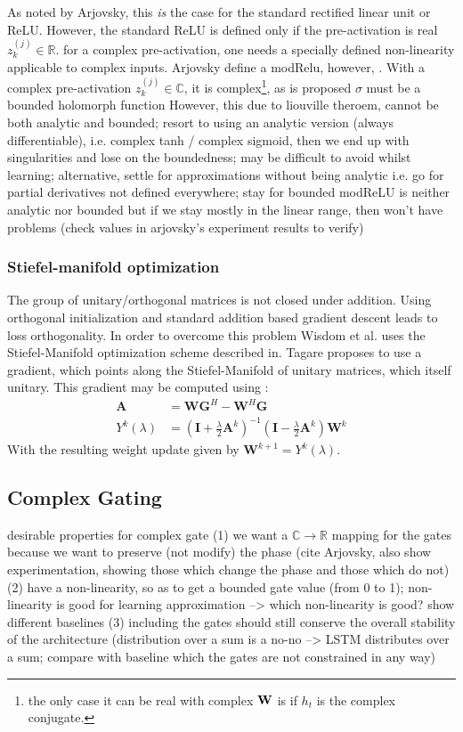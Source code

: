 \documentclass{article}
\begin{document}
As noted by Arjovsky, this \emph{is} the case for the standard rectified linear unit or ReLU.  However, the standard ReLU is defined only if the pre-activation is real \ie $z_k^{(j)} \in \mathbb{R}$.  for a complex pre-activation, one needs a specially defined non-linearity applicable to complex inputs.  Arjovsky define a modRelu, however, 
.  With a complex pre-activation $z_k^{(j)} \in \mathbb{C}$, it is complex\footnote{the only case it can be real with complex $\mathbf{W}$ is if $h_t$ is the complex conjugate.}, as is proposed 
$\sigma$ must be a bounded holomorph function 
However, this
due to liouville theroem, cannot be both analytic and bounded; resort to using an analytic version (always differentiable), i.e. complex tanh / complex sigmoid, then we end up with singularities and lose on the boundedness; may be difficult to avoid whilst learning;
alternative, settle for approximations without being analytic i.e. go for partial derivatives not defined everywhere; stay for bounded
modReLU is neither analytic nor bounded but if we stay mostly in the linear range, then won't have problems (check values in arjovsky's experiment results to verify)

\subsubsection{Stiefel-manifold optimization}
The group of unitary/orthogonal matrices is not closed under addition. Using orthogonal initialization and standard addition based gradient descent leads to loss orthogonality. In order to overcome this problem Wisdom et al.\cite{Wisdom} uses the Stiefel-Manifold optimization scheme described in\cite{Tagare}. Tagare proposes to use a gradient, which points along the Stiefel-Manifold of unitary matrices, which
itself unitary. This gradient may be computed using \cite{Tagare}:
\begin{align}
\mathbf{A} &= \mathbf{W}\mathbf{G}^H - \mathbf{W}^H\mathbf{G} \\
Y^k(\lambda) &=  (\mathbf{I} + \frac{\lambda}{2}\mathbf{A}^k)^{-1}(\mathbf{I} - \frac{\lambda}{2}\mathbf{A}^k)\mathbf{W}^k
\end{align}
With the resulting weight update given by $\mathbf{W}^{k+1} = Y^k(\lambda)$. 

\subsection{Complex Gating}
desirable properties for complex gate
(1) we want a $\mathbb{C} \to \mathbb{R}$ mapping for the gates because we want to preserve (not modify) the phase (cite Arjovsky, also show experimentation, showing those which change the phase and those which do not)
(2) have a non-linearity, so as to get a bounded gate value (from 0 to 1); non-linearity is good for learning approximation --> which non-linearity is good? show different baselines
(3) including the gates should still conserve the overall stability of the architecture (distribution over a sum is a no-no --> LSTM distributes over a sum; compare with baseline which the gates are not constrained in any way) 
\end{document}
